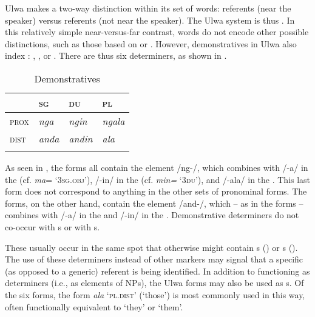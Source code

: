 
Ulwa makes a two-way  distinction within its set of  words:  referents (near the speaker) versus  referents (not near the \linebreak speaker). The Ulwa  system is thus . In this relatively simple near-versus-far contrast,  words do not encode other possible distinctions, such as those based on  or . However, demonstratives in Ulwa also index : , , or . There are thus six  determiners, as shown in .

\begin{table}
\caption{Demonstratives}
\label{tab:7.1}
\begin{tabularx}{.7\textwidth}{lQQQ}
\lsptoprule
& {\scshape sg} & {\scshape du} & {\scshape pl}\\
\midrule
{\scshape prox} & {\itshape nga} & {\itshape ngin} & {\itshape ngala}\\
{\scshape dist} & {\itshape anda} & {\itshape andin} & {\itshape ala}\\
\lspbottomrule
\end{tabularx}
\end{table}
As seen in , the  forms all contain the element /ng-/, which combines with /-a/ in the  (cf. \textit{ma}= ‘3\textsc{sg.obj’}), /-in/ in the  (cf. \textit{min=} ‘3\textsc{du’}), and /-ala/ in the . This last form does not correspond to anything in the other sets of pronominal forms. The  forms, on the other hand, contain the element /and-/, which -- as in the  forms -- combines with /-a/ in the  and /-in/ in the . Demonstrative determiners do not co-occur with s or with s.

These usually occur in the same spot that otherwise might contain s () or s (). The use of these  determiners instead of other markers may signal that a specific (as opposed to a generic) referent is being identified. In addition to functioning as determiners (i.e., as elements of NPs), the Ulwa  forms may also be used as s. Of the six forms, the   form \textit{ala} ‘\textsc{pl.dist}’ (‘those’) is most commonly used in this way, often functionally equivalent to ‘they’ or ‘them’. 

